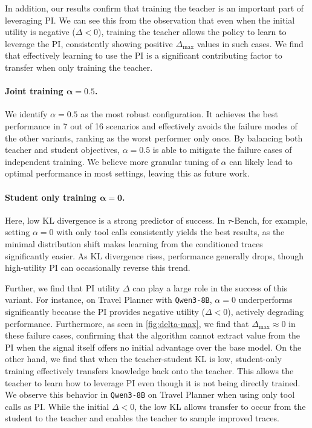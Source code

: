 \documentclass[]{servicenow} %
\begin{document}
In addition, our results confirm that training the teacher is an important part of leveraging PI. We can see this from the observation that even when the initial utility is negative ($\Delta<0$), training the teacher allows the policy to learn to leverage the PI, consistently showing positive $\Delta_{\max}$  values in such cases. We find that effectively learning to use the PI is a significant contributing factor to transfer when only training the teacher.

\paragraph{Joint training $\mathbf{\alpha=0.5}$.} We identify $\alpha=0.5$ as the most robust configuration. It achieves the best performance in 7 out of 16 scenarios and effectively avoids the failure modes of the other variants, ranking as the worst performer only once. By balancing both teacher and student objectives, $\alpha=0.5$ is able to mitigate the failure cases of independent training. We believe more granular tuning of $\alpha$ can likely lead to optimal performance in most settings, leaving this as future work. 


\paragraph{Student only training $\mathbf{\alpha=0}$.}Here, low KL divergence is a strong predictor of success. In $\tau$-Bench, for example, setting $\alpha=0$ with only tool calls consistently yields the best results, as the minimal distribution shift makes learning from the conditioned traces significantly easier. As KL divergence rises, performance generally drops, though high-utility PI can occasionally reverse this trend.

Further, we find that PI utility $\Delta$ can play a large role in the success of this variant. For instance, on Travel Planner with \texttt{Qwen3-8B}, $\alpha=0$ underperforms significantly because the PI provides negative utility ($\Delta < 0$), actively degrading performance. Furthermore, as seen in \cref{fig:delta-max}, we find that $\Delta_{\max} \approx 0$ in these failure cases, confirming that the algorithm cannot extract value from the PI when the signal itself offers no initial advantage over the base model. On the other hand, we find that when the teacher-student KL is low, student-only training effectively transfers knowledge back onto the teacher. This allows the teacher to learn how to leverage PI even though it is not being directly trained. We observe this behavior in \texttt{Qwen3-8B} on Travel Planner when using only tool calls as PI. While the initial $\Delta < 0$, the low KL allows transfer to occur from the student to the teacher and enables the teacher to sample improved traces.
\end{document}
